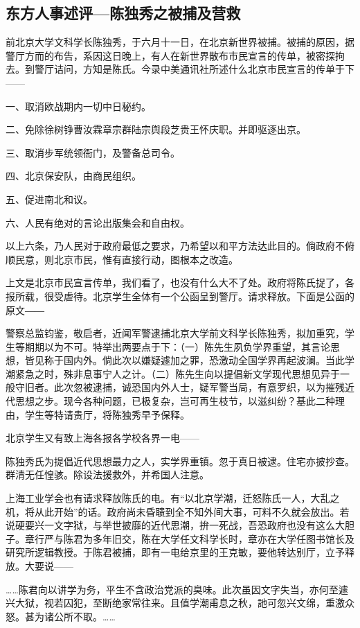 \subsection{东方人事述评—陈独秀之被捕及营救}

前北京大学文科学长陈独秀，于六月十一日，在北京新世界被捕。被捕的原因，据警厅方而的布告，系因这日晚上，有人在新世界散布市民宣言的传单，被密探拘去。到警厅诘问，方知是陈氏。今录中美通讯社所述什么北京市民宣言的传单于下——

一、取消欧战期内一切中日秘约。

二、免除徐树铮曹汝霖章宗群陆宗舆段芝贵王怀庆职。并即驱逐出京。

三、取消步军统领衙门，及警备总司令。

四、北京保安队，由商民组织。

五、促进南北和议。

六、人民有绝对的言论出版集会和自由权。

以上六条，乃人民对于政府最低之要求，乃希望以和平方法达此目的。倘政府不俯顺民意，则北京市民，惟有直接行动，图根本之改造。

上文是北京市民宣言传单，我们看了，也没有什么大不了处。政府将陈氏捉了，各报所载，很受虐待。北京学生全体有一个公函呈到警厅。请求释放。下面是公函的原文――

警察总监钧鉴，敬启者，近闻军警逮捕北京大学前文科学长陈独秀，拟加重究，学生等期期以为不可。特举出两要点于下：（一）陈先生夙负学界重望，其言论思想，皆见称于国内外。倘此次以嫌疑遽加之罪，恐激动全国学界再起波澜。当此学潮紧急之时，殊非息事宁人之计。（二）陈先生向以提倡新文学现代思想见异于一般守旧者。此次忽被逮捕，诚恐国内外人士，疑军警当局，有意罗织，以为摧残近代思想之步。现今各种问题，已极复杂，岂可再生枝节，以滋纠纷？基此二种理由，学生等特请贵厅，将陈独秀早予保释。

北京学生又有致上海各报各学校各界一电——

陈独秀氏为提倡近代思想最力之人，实学界重镇。忽于真日被逮。住宅亦披抄查。群清无任惶骇。除设法援救外，并希国人注意。

上海工业学会也有请求释放陈氏的电。有“以北京学潮，迁怒陈氏一人，大乱之机，将从此开始”的话。政府尚未昏聩到全不知外间大事，可料不久就会放出。若说硬要兴一文字狱，与举世披靡的近代思潮，拚一死战，吾恐政府也没有这么大胆子。章行严与陈君为多年旧交，陈在大学任文科学长时，章亦在大学任图书馆长及研究所逻辑教授。于陈君被捕，即有一电给京里的王克敏，要他转达别厅，立予释放。大要说——

……陈君向以讲学为务，平生不含政治党派的臭味。此次虽因文字失当，亦何至遽兴大狱，视若囚犯，至断绝家常往来。且值学潮甫息之秋，訑可忽兴文绵，重激众怒。甚为诸公所不取。……

